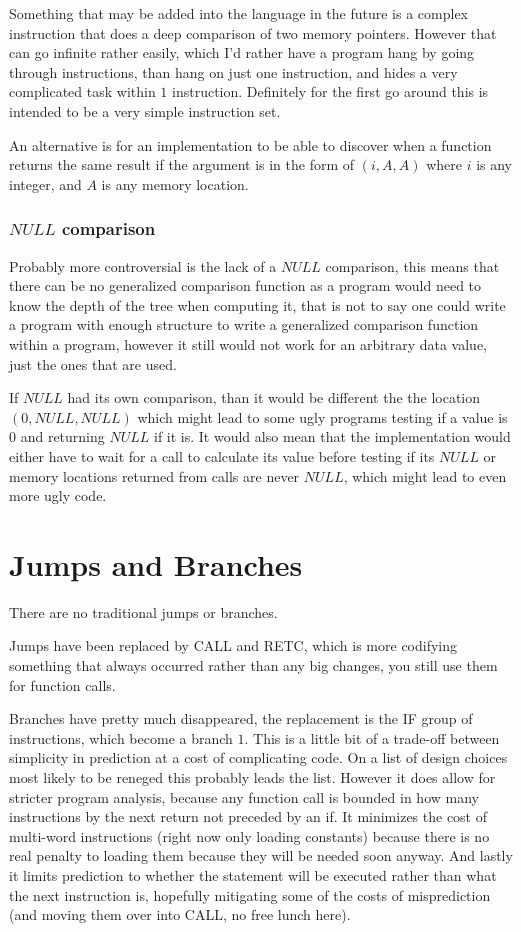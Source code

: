 \documentclass[12pt,letterpaper]{report}
\newcommand{\mem}[3]{\left(#1, #2, #3\right)}
\newcommand{\nil}{NULL}
\begin{document}
Something that may be added into the language in the future is a complex instruction that does a deep comparison of two memory pointers. However that can go infinite rather easily, which I'd rather have a program hang by going through instructions, than hang on just one instruction, and hides a very complicated task within $1$ instruction. Definitely for the first go around this is intended to be a very simple instruction set.

An alternative is for an implementation to be able to discover when a function returns the same result if the argument is in the form of $\mem{i}{A}{A}$ where $i$ is any integer, and $A$ is any memory location.
\subsubsection{$\nil$ comparison}
Probably more controversial is the lack of a $\nil$ comparison, this means that there can be no generalized comparison function as a program would need to know the depth of the tree when computing it, that is not to say one could write a program with enough structure to write a generalized comparison function within a program, however it still would not work for an arbitrary data value, just the ones that are used.

If $\nil$ had its own comparison, than it would be different the the location $\mem{0}{\nil}{\nil}$ which might lead to some ugly programs testing if a value is $0$ and returning $\nil$ if it is. It would also mean that the implementation would either have to wait for a call to calculate its value before testing if its $\nil$ or memory locations returned from calls are never $\nil$, which might lead to even more ugly code.

\section{Jumps and Branches}
There are no traditional jumps or branches.

Jumps have been replaced by CALL and RETC, which is more codifying something that always occurred rather than any big changes, you still use them for function calls.

Branches have pretty much disappeared, the replacement is the IF group of instructions, which become a branch $1$. This is a little bit of a trade-off between simplicity in prediction at a cost of complicating code. On a list of design choices most likely to be reneged this probably leads the list. However it does allow for stricter program analysis, because any function call is bounded in how many instructions by the next return not preceded by an if. It minimizes the cost of multi-word instructions (right now only loading constants) because there is no real penalty to loading them because they will be needed soon anyway. And lastly it limits prediction to whether the statement will be executed rather than what the next instruction is, hopefully mitigating some of the costs of misprediction (and moving them over into CALL, no free lunch here).
\end{document}
